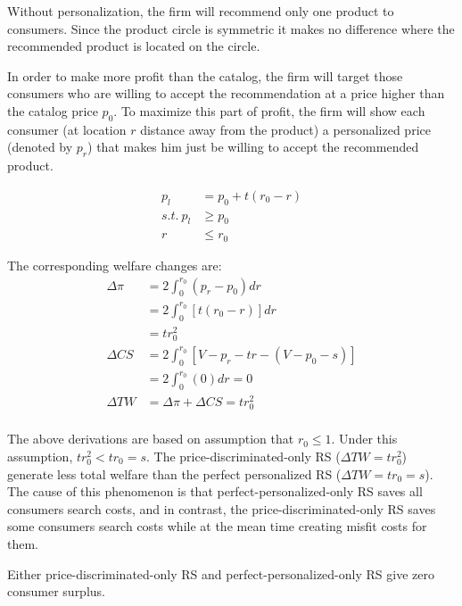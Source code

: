 \documentclass[11pt, oneside]{article}   	%
\begin{document}
Without personalization, the firm will recommend only one product to consumers. Since the product circle is symmetric it makes no difference where the recommended product is located on the circle.

In order to make more profit than the catalog, the firm will target those consumers who are willing to accept the recommendation at a price higher than the catalog price $p_0$. To maximize this part of profit, the firm will show each consumer (at location $r$ distance away from the product) a personalized price (denoted by $p_r$) that makes him just be willing to accept the recommended product. 

\begin{align} p_l &= p_0 + t(r_0 - r )\\
s.t. {~}p_l &\geq p_0 \nonumber \\
 r& \leq r_0 \nonumber
\end{align}

The corresponding welfare changes are:
\begin{align}
\Delta \pi &= 2\int^{r_0}_0\nonumber (p_r-p_0) dr\\
&=2\int^{r_0}_0[t(r_0-r)]dr \nonumber \\
&=tr_0^2\\ 
\Delta CS &=2\int_0^{r_0} [V-p_r-tr - (V-p_0-s)] \nonumber\\
&=2\int^{r_0}_0(0)dr = 0\\
\Delta TW &=\Delta \pi + \Delta CS = tr_0^2 \nonumber \\ 
\end{align}

The above derivations are based on assumption that $r_0 \leq 1$. Under this assumption, $tr_0^2 < tr_0 = s$. The price-discriminated-only RS ($\Delta TW = tr_0^2$) generate less total welfare than the perfect personalized RS ($\Delta TW = tr_0 = s$). The cause of this phenomenon is that perfect-personalized-only RS saves all consumers search costs, and in contrast, the price-discriminated-only RS saves some consumers search costs while at the mean time creating misfit costs for them.

Either price-discriminated-only RS and perfect-personalized-only RS give zero consumer surplus.
\end{document}

